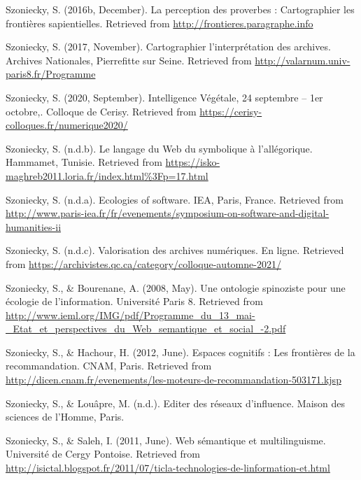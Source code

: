\documentclass[
  a4paper,
  DIV=11,
  numbers=noendperiod]{scrreprt}
\newlength{\cslhangindent}
\newenvironment{CSLReferences}[2] %
 {\begin{list}{}{%
  \setlength{\itemindent}{0pt}
  \setlength{\leftmargin}{0pt}
  \setlength{\parsep}{0pt}
  \ifodd #1
   \setlength{\leftmargin}{\cslhangindent}
   \setlength{\itemindent}{-1\cslhangindent}
  \fi
  \setlength{\itemsep}{#2\baselineskip}}}
 {\end{list}}
\begin{document}
\begin{CSLReferences}{1}{0}
Szoniecky, S. (2016b, December). La perception des proverbes :
Cartographier les frontières sapientielles. Retrieved from
\url{http://frontieres.paragraphe.info}

Szoniecky, S. (2017, November). Cartographier l'interprétation des
archives. Archives Nationales, Pierrefitte sur Seine. Retrieved from
\url{http://valarnum.univ-paris8.fr/Programme}

Szoniecky, S. (2020, September). Intelligence {Végétale}, 24 septembre
-- 1er octobre,. Colloque de Cerisy. Retrieved from
\url{https://cerisy-colloques.fr/numerique2020/}

Szoniecky, S. (n.d.b). Le langage du {Web} du symbolique à
l'allégorique. Hammamet, Tunisie. Retrieved from
\url{https://isko-maghreb2011.loria.fr/index.html\%3Fp=17.html}

Szoniecky, S. (n.d.a). Ecologies of software. IEA, Paris, France.
Retrieved from
\url{http://www.paris-iea.fr/fr/evenements/symposium-on-software-and-digital-humanities-ii}

Szoniecky, S. (n.d.c). Valorisation des archives numériques. En ligne.
Retrieved from
\url{https://archivistes.qc.ca/category/colloque-automne-2021/}

Szoniecky, S., \& Bourenane, A. (2008, May). Une ontologie spinoziste
pour une écologie de l'information. Université Paris 8. Retrieved from
\url{http://www.ieml.org/IMG/pdf/Programme_du_13_mai-_Etat_et_perspectives_du_Web_semantique_et_social_-2.pdf}

Szoniecky, S., \& Hachour, H. (2012, June). Espaces cognitifs : Les
frontières de la recommandation. CNAM, Paris. Retrieved from
\url{http://dicen.cnam.fr/evenements/les-moteurs-de-recommandation-503171.kjsp}

Szoniecky, S., \& Louâpre, M. (n.d.). Editer des réseaux d'influence.
Maison des sciences de l'Homme, Paris.

Szoniecky, S., \& Saleh, I. (2011, June). Web sémantique et
multilinguisme. Université de Cergy Pontoise. Retrieved from
\url{http://isictal.blogspot.fr/2011/07/ticla-technologies-de-linformation-et.html}

\end{CSLReferences}
\end{document}
